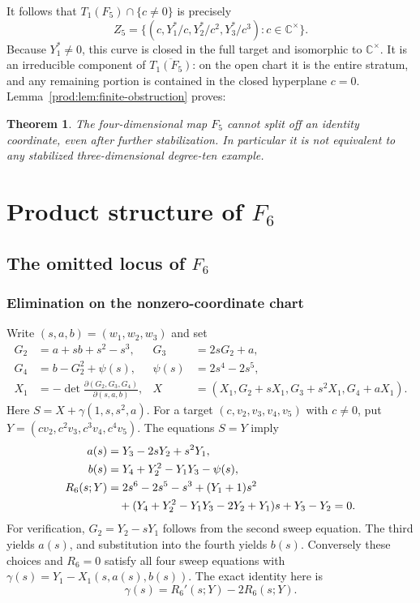 \documentclass[11pt]{article}
\numberwithin{equation}{section}
\theoremstyle{plain}
\newtheorem{theorem}{Theorem}[section]
\theoremstyle{definition}
\theoremstyle{remark}
\newcommand{\C}{\mathbb{C}}
\begin{document}
It follows that $T_1(F_5)\cap\{c\ne0\}$ is precisely
\[
 Z_5=\{(c,Y_1^*/c,Y_2^*/c^2,Y_3^*/c^3):c\in\C^\times\}.
\]
Because $Y_1^*\ne0$, this curve is closed in the full target and isomorphic
to $\C^\times$. It is an irreducible component of
$\overline{T_1(F_5)}$: on the open chart it is the entire stratum, and
any remaining portion is contained in the closed hyperplane $c=0$.
Lemma~\ref{prod:lem:finite-obstruction} proves:
\begin{theorem}\label{prod:thm:F5-complete}
The four-dimensional map $F_5$ cannot split off an identity coordinate,
even after further stabilization. In particular it is not equivalent to
any stabilized three-dimensional degree-ten example.
\end{theorem}

\section{Product structure of \texorpdfstring{$F_6$}{F6}}\label{prod:sec:F6}
\subsection{The omitted locus of \texorpdfstring{$F_6$}{F6}}\label{prod:sec:F6-omitted}
\subsubsection{Elimination on the nonzero-coordinate chart}
Write $(s,a,b)=(w_1,w_2,w_3)$ and set
\begin{align*}
 G_2&=a+sb+s^2-s^3,& G_3&=2sG_2+a,\\
 G_4&=b-G_2^2+\psi(s),& \psi(s)&=2s^4-2s^5,\\
 X_1&=-\det\frac{\partial(G_2,G_3,G_4)}{\partial(s,a,b)},&
 X&=(X_1,G_2+sX_1,G_3+s^2X_1,G_4+aX_1).
\end{align*}
Here $S=X+\gamma(1,s,s^2,a)$. For a target $(c,v_2,v_3,v_4,v_5)$ with
$c\ne0$, put $Y=(cv_2,c^2v_3,c^3v_4,c^4v_5)$.
The equations $S=Y$ imply
\begin{align}
 a(s)&=Y_3-2sY_2+s^2Y_1,\notag\\
 b(s)&=Y_4+Y_2^2-Y_1Y_3-\psi(s),\label{prod:eq:ab6}\\
 R_6(s;Y)&=2s^6-2s^5-s^3+(Y_1+1)s^2\notag\\
 &\quad +(Y_4+Y_2^2-Y_1Y_3-2Y_2+Y_1)s+Y_3-Y_2=0.
 \label{prod:eq:R6}
\end{align}
For verification, $G_2=Y_2-sY_1$ follows from the second sweep equation.
The third yields $a(s)$, and substitution into the fourth yields $b(s)$.
Conversely these choices and $R_6=0$ satisfy all four sweep equations
with $\gamma(s)=Y_1-X_1(s,a(s),b(s))$.
The exact identity here is
\begin{equation}\label{prod:eq:deriv6}
 \gamma(s)=R_6'(s;Y)-2R_6(s;Y).
\end{equation}
\end{document}
